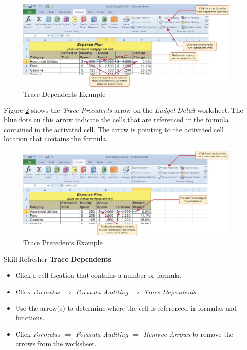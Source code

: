 \begin{figure}[H]
	\centering
	\includegraphics[width=\maxwidth{.95\linewidth}]{gfx/ch02_fig09}
	\caption{Trace Dependents Example}
	\label{02:fig09}
\end{figure}

Figure \ref{02:fig10} shows the \textit{Trace Precedents} arrow on the \textit{Budget Detail} worksheet. The blue dots on this arrow indicate the cells that are referenced in the formula contained in the activated cell. The arrow is pointing to the activated cell location that contains the formula.

\begin{figure}[H]
	\centering
	\includegraphics[width=\maxwidth{.95\linewidth}]{gfx/ch02_fig10}
	\caption{Trace Precedents Example}
	\label{02:fig10}
\end{figure}

\begin{center}
	\begin{sklbox}{Skill Refresher}
		\textbf{Trace Dependents}
		\\
		\begin{itemize}
			\setlength{\itemsep}{0pt}
			\setlength{\parskip}{0pt}
			\setlength{\parsep}{0pt}
			
			\item Click a cell location that contains a number or formula.
			\item Click \textit{Formulas $ \Rightarrow $ Formula Auditing $ \Rightarrow $ Trace Dependents}.
			\item Use the arrow(s) to determine where the cell is referenced in formulas and functions.
			\item Click \textit{Formulas $ \Rightarrow $ Formula Auditing $ \Rightarrow $ Remove Arrows} to remove the arrows from the worksheet.
			
		\end{itemize}
	\end{sklbox}
\end{center}

